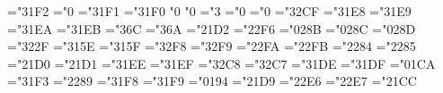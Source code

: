 \mathchardef\between="31F2
\mathchardef\blacktriangledown="0
\mathchardef\blacktriangleright="31F1
\mathchardef\blacktriangleleft="31F0
\mathchardef\arrowaxisright"0
\mathchardef\arrowaxisleft"0
\mathchardef\vartriangle="3
\mathchardef\blacktriangle="0
\mathchardef\triangledown="0
\mathchardef\eqcirc="32CF
\mathchardef\lesseqgtr="31E8
\mathchardef\gtreqless="31E9
\mathchardef\lesseqqgtr="31EA
\mathchardef\gtreqqless="31EB
\mathchardef\Rrightarrow="3\thearfam 6C
\mathchardef\Lleftarrow="3\thearfam 6A
\mathchardef\veebar="21D2
\mathchardef\barwedge="22F6
\mathchardef\angle="028B
\mathchardef\measuredangle="028C
\mathchardef\sphericalangle="028D
\mathchardef\varpropto="322F %
\mathchardef\smallsmile="315E %
\mathchardef\smallfrown="315F %
\mathchardef\Subset="32F8
\mathchardef\Supset="32F9
\mathchardef\Cup="22FA
\mathchardef\Cap="22FB
\mathchardef\curlywedge="2284
\mathchardef\curlyvee="2285
\mathchardef\leftthreetimes="21D0
\mathchardef\rightthreetimes="21D1
\mathchardef\subseteqq="31EE
\mathchardef\supseteqq="31EF
\mathchardef\bumpeq="32C8
\mathchardef\Bumpeq="32C7
\mathchardef\lll="31DE
\mathchardef\ggg="31DF
\mathchardef\circledS="01CA
\mathchardef\pitchfork="31F3
\mathchardef\dotplus="2289
\mathchardef\backsim="31F8
\mathchardef\backsimeq="31F9
\mathchardef\complement="0194
\mathchardef\intercal="21D9
\mathchardef\circledcirc="22E6
\mathchardef\circledast="22E7
\mathchardef\circleddash="21CC



